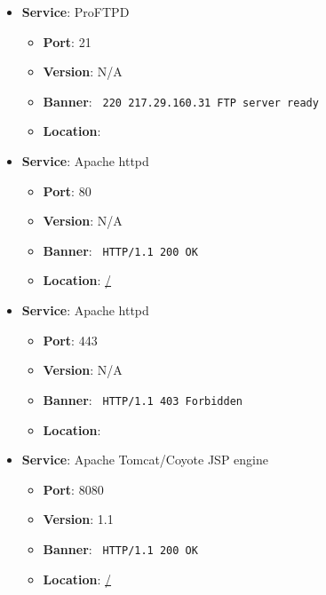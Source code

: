 \documentclass{article}
\begin{document}
\begin{itemize}
    
        \item \textbf{Service}: ProFTPD
        \begin{itemize}
            \item \textbf{Port}: 21
            \item \textbf{Version}:  N/A 
            \item \textbf{Banner}: \texttt{
                220 217.29.160.31 FTP server ready
            }
            \item \textbf{Location}: \href{  }{  }
        \end{itemize}
    
        \item \textbf{Service}: Apache httpd
        \begin{itemize}
            \item \textbf{Port}: 80
            \item \textbf{Version}:  N/A 
            \item \textbf{Banner}: \texttt{
                HTTP/1.1 200 OK
            }
            \item \textbf{Location}: \href{ / }{ / }
        \end{itemize}
    
        \item \textbf{Service}: Apache httpd
        \begin{itemize}
            \item \textbf{Port}: 443
            \item \textbf{Version}:  N/A 
            \item \textbf{Banner}: \texttt{
                HTTP/1.1 403 Forbidden
            }
            \item \textbf{Location}: \href{  }{  }
        \end{itemize}
    
        \item \textbf{Service}: Apache Tomcat/Coyote JSP engine
        \begin{itemize}
            \item \textbf{Port}: 8080
            \item \textbf{Version}:  1.1 
            \item \textbf{Banner}: \texttt{
                HTTP/1.1 200 OK
            }
            \item \textbf{Location}: \href{ / }{ / }
        \end{itemize}
    
\end{itemize}
\end{document}
